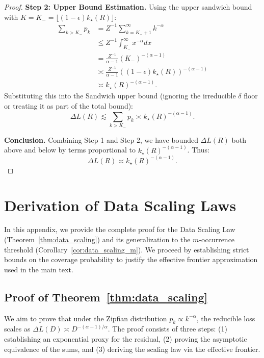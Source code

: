 \documentclass{article}
\theoremstyle{plain}
\theoremstyle{definition}
\theoremstyle{remark}
\begin{document}
\begin{proof}
\textbf{Step 2: Upper Bound Estimation.}
Using the upper sandwich bound with $K = K_- = \lfloor (1-\epsilon)k_\star(R) \rfloor$:
\begin{align*}
\sum_{k > K_-} p_k &= Z^{-1} \sum_{k=K_- + 1}^\infty k^{-\alpha} \\
&\le Z^{-1} \int_{K_-}^\infty x^{-\alpha} dx \\
&= \frac{Z^{-1}}{\alpha-1} (K_-)^{-(\alpha-1)} \\
&\asymp \frac{Z^{-1}}{\alpha-1} \left( (1-\epsilon)k_\star(R) \right)^{-(\alpha-1)} \\
&\asymp k_\star(R)^{-(\alpha-1)}.
\end{align*}
Substituting this into the Sandwich upper bound (ignoring the irreducible $\delta$ floor or treating it as part of the total bound):
\[
\Delta L(R) \lesssim \sum_{k>K_-} p_k \asymp k_\star(R)^{-(\alpha-1)}.
\]

\textbf{Conclusion.}
Combining Step 1 and Step 2, we have bounded $\Delta L(R)$ both above and below by terms proportional to $k_\star(R)^{-(\alpha-1)}$.
Thus:
\[
\Delta L(R) \asymp k_\star(R)^{-(\alpha-1)}.
\]
\end{proof}





\section{Derivation of Data Scaling Laws}
\label{app:data_scaling}

In this appendix, we provide the complete proof for the Data Scaling Law (Theorem~\ref{thm:data_scaling}) and its generalization to the $m$-occurrence threshold (Corollary~\ref{cor:data_scaling_m}). We proceed by establishing strict bounds on the coverage probability to justify the effective frontier approximation used in the main text.

\subsection{Proof of Theorem~\ref{thm:data_scaling}}
\label{app:proof_thm_data}

We aim to prove that under the Zipfian distribution $p_k \propto k^{-\alpha}$, the reducible loss scales as $\Delta L(D) \asymp D^{-(\alpha-1)/\alpha}$. The proof consists of three steps: (1) establishing an exponential proxy for the residual, (2) proving the asymptotic equivalence of the sums, and (3) deriving the scaling law via the effective frontier.
\end{document}
